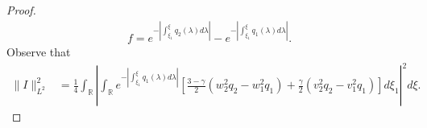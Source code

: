 \documentclass[12pt,reqno]{amsart}
\numberwithin{equation}{section}  %
\numberwithin{figure}{section}
\newcommand{\rr}{\mathbb{R}}
\begin{document}
\begin{proof}
\begin{gather*}
    f = e^{-| \int_{\xi_{1}}^{\xi} q_{2}(\lambda) d \lambda |} -
      e^{- | \int_{\xi_{1}}^{\xi} q_{1}(\lambda) d \lambda |}.
\end{gather*}
Observe that
%
\begin{equation}
  \label{q-l2-pre}
\begin{split}
  \| I \|_{L^{2}}^{2} & = \frac{1}{4} \int_{\rr} | \int_{\rr} e^{-| \int_{\xi_{1}}^{\xi}q_{1}(\lambda) d \lambda |}  \left[ \frac{3 - \gamma}{2}(w_{2}^{2} q_{2} -
  w_{1}^{2}q_{1}) + \frac{\gamma}{2}(v_{2}^{2} q_{2} - v_{1}^{2} q_{1}) \right]  d
  \xi_{1} |^{2} d \xi.
\end{split}
\end{equation}
%

\end{proof}
\end{document}
